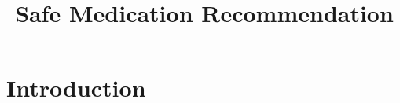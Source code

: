 \documentclass[sigconf,review,anonymous]{acmart}
\begin{document}
\title{Safe Medication Recommendation}

\begin{abstract}
\end{abstract}

\maketitle

\section{Introduction}



\end{document}
